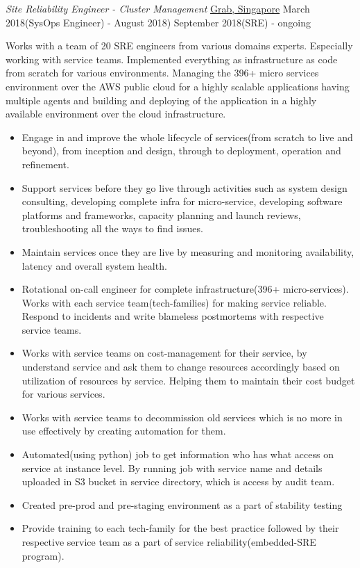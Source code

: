 \documentclass[]{friggeri-cv} %
\begin{document}
\begin{entrylist}
\entry
{\emph{Site Reliability Engineer - Cluster Management}}
{\href{https://www.grab.com/sg/}{Grab, Singapore}}
{March 2018(SysOps Engineer) - August 2018) September 2018(SRE) - ongoing}
{Works with a team of 20 SRE engineers from various domains experts. Especially working with service teams. Implemented everything as infrastructure as code from scratch for various environments. Managing the 396+ micro services environment over the AWS public cloud for a highly scalable applications having multiple agents and building and deploying of the application in a highly available environment over the cloud infrastructure.
\begin{itemize}
\item {Engage in and improve the whole lifecycle of services(from scratch to live and beyond), from inception and design, through to deployment, operation and refinement.}
\item {Support services before they go live through activities such as system design consulting, developing complete infra for micro-service, developing software platforms and frameworks, capacity planning and launch reviews, troubleshooting all the ways to find issues.}
\item {Maintain services once they are live by measuring and monitoring availability, latency and overall system health.}
\item {Rotational on-call engineer for complete infrastructure(396+ micro-services). Works with each service team(tech-families) for making service reliable. Respond to incidents and write blameless postmortems with respective service teams.}
\item {Works with service teams on cost-management for their service, by understand service and ask them to change resources accordingly based on utilization of resources by service. Helping them to maintain their cost budget for various services.}
\item {Works with service teams to decommission old services which is no more in use effectively by creating automation for them.}
\item {Automated(using python) job to get information who has what access on service at instance level. By running job with service name and details uploaded in S3 bucket in service directory, which is access by audit team.}
\item {Created pre-prod and pre-staging environment as a part of stability testing}
\item {Provide training to each tech-family for the best practice followed by their respective service team as a part of service reliability(embedded-SRE program).}
\end{itemize}}
\end{entrylist}
\end{document}
